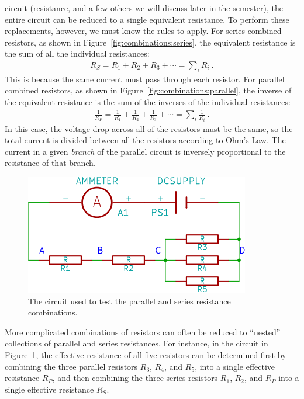 \documentclass[12pt]{article}
\begin{document}
circuit (resistance, and a few others we will discuss later in the
semester), the entire circuit can be reduced to a single equivalent
resistance.  To perform these replacements, however, we must know the
rules to apply.  For series combined resistors, as shown in
Figure~\ref{fig:combinations:series}, the equivalent resistance is the
sum of all the individual resistances:
\begin{gather*}
  R_S = R_1 + R_2 + R_3 + \cdots = \sum_i R_i\ .
\end{gather*}
This is because the same current must pass through each resistor.  For
parallel combined resistors, as shown in
Figure~\ref{fig:combinations:parallel}, the inverse of the equivalent
resistance is the sum of the inverses of the individual resistances:
\begin{gather*}
  \frac{1}{R_P } = \frac{1}{R_1} + \frac{1}{R_2} + \frac{1}{R_3} +
  \cdots = \sum_i \frac{1}{R_i}\ .
\end{gather*}
In this case, the voltage drop across all of the resistors must be the
same, so the total current is divided between all the resistors
according to Ohm's Law.  The current in a given \textit{branch} of the
parallel circuit is inversely proportional to the resistance of that
branch.

\begin{figure}
  \centering
  \includegraphics[width=2\textwidth/3]{figures/circuit}
  \caption{The circuit used to test the parallel and series resistance
    combinations.} 
  \label{fig:circuit}
\end{figure}
More complicated combinations of resistors can often be reduced to
``nested'' collections of parallel and series resistances.  For
instance, in the circuit in Figure~\ref{fig:circuit}, the effective
resistance of all five resistors can be determined first by combining
the three parallel resistors $R_3$, $R_4$, and $R_5$, into a single
effective resistance $R_P$, and then combining the three series
resistors $R_1$, $R_2$, and $R_P$ into a single effective resistance
$R_S$.
\end{document}
